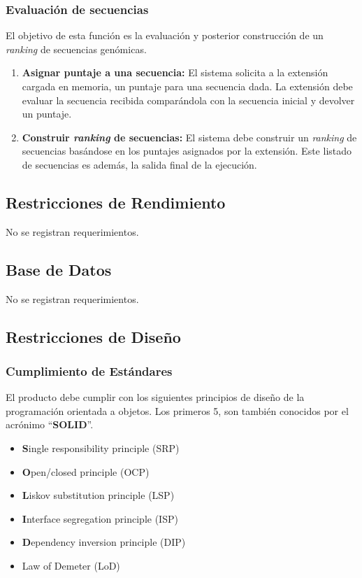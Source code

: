 \documentclass[10pt,a4paper]{article}
\begin{document}
  \subsubsection{Evaluaci\'on de secuencias}
  El objetivo de esta funci\'on es la evaluaci\'on y posterior construcci\'on de
un \textit{ranking} de secuencias gen\'omicas.
  \begin{enumerate}    
    \item \textbf{Asignar puntaje a una secuencia:}
    El sistema solicita a la extensi\'on cargada en memoria, un puntaje para una
secuencia dada. La extensi\'on debe evaluar la secuencia recibida compar\'andola
con la secuencia inicial y devolver un puntaje.
    
    \item \textbf{Construir \textit{ranking} de secuencias:}
    El sistema debe construir un \textit{ranking} de secuencias bas\'andose en
los puntajes asignados por la extensi\'on. Este listado de secuencias es
adem\'as, la salida final de la ejecuci\'on.
  \end{enumerate}

  \subsection{Restricciones de Rendimiento}
  No se registran requerimientos.

  \subsection{Base de Datos}
  No se registran requerimientos.

  \subsection{Restricciones de Dise\~no}
    \subsubsection{Cumplimiento de Est\'andares}
    El producto debe cumplir con los siguientes principios de dise\~no de la
programaci\'on orientada a objetos. Los primeros 5, son tambi\'en conocidos por
el acr\'onimo ``\textbf{SOLID}''.
    \begin{itemize}
      \item \textbf{S}ingle responsibility principle (SRP)
      \item \textbf{O}pen/closed principle (OCP)
      \item \textbf{L}iskov substitution principle (LSP)
      \item \textbf{I}nterface segregation principle (ISP)
      \item \textbf{D}ependency inversion principle (DIP)   
      \item Law of Demeter (LoD)
    \end{itemize}
\end{document}

